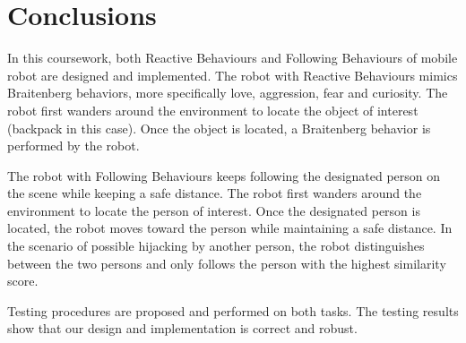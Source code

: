 \chapter{Conclusions}
\label{chap:discussion}


In this coursework, both Reactive Behaviours and Following Behaviours of mobile robot are designed and implemented.
The robot with Reactive Behaviours mimics Braitenberg behaviors, more specifically love, aggression, fear and curiosity.
The robot first wanders around the environment to locate the object of interest (backpack in this case). Once the object is located, a  Braitenberg behavior is performed by the robot.

The robot with Following Behaviours keeps following the designated person on the scene while keeping a safe distance.
The robot first wanders around the environment to locate the person of interest.
Once the designated person is located, the robot moves toward the person while maintaining a safe distance.
In the scenario of possible hijacking by another person, the robot distinguishes between the two persons and only follows the person with the highest similarity score.

Testing procedures are proposed and performed on both tasks. The testing results show that our design and implementation is correct and robust.

